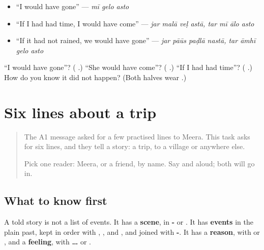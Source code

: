 \begin{itemize}
\raggedright
  \item \textquotedblleft{}I would have gone\textquotedblright{} — \emph{mī gelo asto}
  \item \textquotedblleft{}If I had had time, I would have come\textquotedblright{} — \emph{jar malā veḷ astā, tar mī ālo asto}
  \item \textquotedblleft{}If it had not rained, we would have gone\textquotedblright{} — \emph{jar pāūs paḍlā nastā, tar āmhī gelo asto}
\end{itemize}

\begin{tcolorbox}[breakable,colback=teal!4,colframe=teal!35!black,title={Before you move on}]
\textquotedblleft{}I would have gone\textquotedblright{}? (\textbf{  }.) \textquotedblleft{}She would have come\textquotedblright{}? (\textbf{  }.) \textquotedblleft{}If I had had time\textquotedblright{}? (\textbf{   }.) How do you know it did not happen? (Both halves wear \textbf{}.)
\end{tcolorbox}
\section[(six lines)]{Six lines about a trip}

\label{lesson:MR-W287-six-lines}



\begin{quote}
The A1 message asked for a few practised lines to Meera. This task asks for six lines, and they tell a story: a trip, to a village or anywhere else.

Pick one reader: Meera, or a friend, by name. Say \textbf{} and \textbf{} aloud; both will go in.
\end{quote}

\subsection*{What to know first}
A told story is not a list of events. It has a \textbf{scene}, in \textbf{- } or \textbf{}. It has \textbf{events} in the plain past, kept in order with \textbf{}, \textbf{}, \textbf{} and \textbf{}, and joined with \textbf{-}. It has a \textbf{reason}, with \textbf{} or \textbf{}, and a \textbf{feeling}, with \textbf{ … } or \textbf{}.

